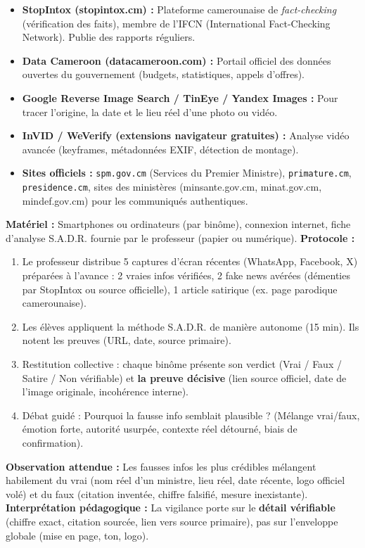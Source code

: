\documentclass[11pt]{article}
\newcommand{\cle}[1]{{\popxbold\color{popdark}#1}}
\begin{document}
\begin{aretenir}
\begin{itemize}
    \item \textbf{StopIntox (stopintox.cm) :} Plateforme camerounaise de \emph{fact-checking} (vérification des faits), membre de l'IFCN (International Fact-Checking Network). Publie des rapports réguliers.
    \item \textbf{Data Cameroon (datacameroon.com) :} Portail officiel des données ouvertes du gouvernement (budgets, statistiques, appels d'offres).
    \item \textbf{Google Reverse Image Search / TinEye / Yandex Images :} Pour tracer l'origine, la date et le lieu réel d'une photo ou vidéo.
    \item \textbf{InVID / WeVerify (extensions navigateur gratuites) :} Analyse vidéo avancée (keyframes, métadonnées EXIF, détection de montage).
    \item \textbf{Sites officiels :} \texttt{spm.gov.cm} (Services du Premier Ministre), \texttt{primature.cm}, \texttt{presidence.cm}, sites des ministères (minsante.gov.cm, minat.gov.cm, mindef.gov.cm) pour les communiqués authentiques.
\end{itemize}
\end{aretenir}

\begin{experience}
\textbf{Matériel :} Smartphones ou ordinateurs (par binôme), connexion internet, fiche d'analyse S.A.D.R. fournie par le professeur (papier ou numérique).
\textbf{Protocole :}
\begin{enumerate}
    \item Le professeur distribue 5 captures d'écran récentes (WhatsApp, Facebook, X) préparées à l'avance : 2 vraies infos vérifiées, 2 \cle{fake news} avérées (démenties par StopIntox ou source officielle), 1 article satirique (ex. page parodique camerounaise).
    \item Les élèves appliquent la méthode S.A.D.R. de manière autonome (15 min). Ils notent les preuves (URL, date, source primaire).
    \item Restitution collective : chaque binôme présente son verdict (Vrai / Faux / Satire / Non vérifiable) et \textbf{la preuve décisive} (lien source officiel, date de l'image originale, incohérence interne).
    \item Débat guidé : Pourquoi la fausse info semblait plausible ? (Mélange vrai/faux, émotion forte, autorité usurpée, contexte réel détourné, biais de confirmation).
\end{enumerate}
\textbf{Observation attendue :} Les fausses infos les plus crédibles mélangent habilement du vrai (nom réel d'un ministre, lieu réel, date récente, logo officiel volé) et du faux (citation inventée, chiffre falsifié, mesure inexistante).
\textbf{Interprétation pédagogique :} La vigilance porte sur le \textbf{détail vérifiable} (chiffre exact, citation sourcée, lien vers source primaire), pas sur l'enveloppe globale (mise en page, ton, logo).
\end{experience}
\end{document}
